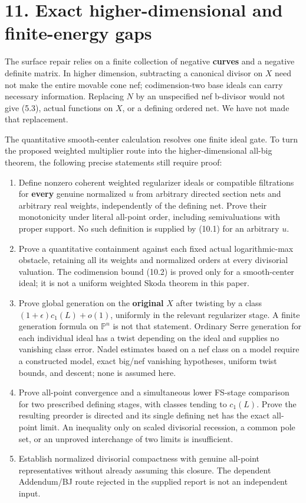 \documentclass[
  10pt,
]{article}
\providecommand{\tightlist}{%
  \setlength{\itemsep}{0pt}\setlength{\parskip}{0pt}}
\begin{document}
\section{11. Exact higher-dimensional and finite-energy
gaps}\label{exact-higher-dimensional-and-finite-energy-gaps}

The surface repair relies on a finite collection of negative
\textbf{curves} and a negative definite matrix. In higher dimension,
subtracting a canonical divisor on \(X\) need not make the entire
movable cone nef; codimension-two base ideals can carry necessary
information. Replacing \(N\) by an unspecified nef b-divisor would not
give (5.3), actual functions on \(X\), or a defining ordered net. We
have not made that replacement.

The quantitative smooth-center calculation resolves one finite ideal
gate. To turn the proposed weighted multiplier route into the
higher-dimensional all-big theorem, the following precise statements
still require proof:

\begin{enumerate}
\def\labelenumi{\arabic{enumi}.}
\tightlist
\item
  Define nonzero coherent weighted regularizer ideals or compatible
  filtrations for \textbf{every} genuine normalized \(u\) from arbitrary
  directed section nets and arbitrary real weights, independently of the
  defining net. Prove their monotonicity under literal all-point order,
  including semivaluations with proper support. No such definition is
  supplied by (10.1) for an arbitrary \(u\).
\item
  Prove a quantitative containment against each fixed actual
  logarithmic-max obstacle, retaining all its weights and normalized
  orders at every divisorial valuation. The codimension bound (10.2) is
  proved only for a smooth-center ideal; it is not a uniform weighted
  Skoda theorem in this paper.
\item
  Prove global generation on the \textbf{original} \(X\) after twisting
  by a class \((1+\epsilon)c_1(L)+o(1)\), uniformly in the relevant
  regularizer stage. A finite generation formula on \(\mathbb P^n\) is
  not that statement. Ordinary Serre generation for each individual
  ideal has a twist depending on the ideal and supplies no vanishing
  class error. Nadel estimates based on a nef class on a model require a
  constructed model, exact big/nef vanishing hypotheses, uniform twist
  bounds, and descent; none is assumed here.
\item
  Prove all-point convergence and a simultaneous lower FS-stage
  comparison for two prescribed defining stages, with classes tending to
  \(c_1(L)\). Prove the resulting preorder is directed and its single
  defining net has the exact all-point limit. An inequality only on
  scaled divisorial recession, a common pole set, or an unproved
  interchange of two limits is insufficient.
\item
  Establish normalized divisorial compactness with genuine all-point
  representatives without already assuming this closure. The dependent
  Addendum/BJ route rejected in the supplied report is not an
  independent input.
\end{enumerate}
\end{document}
